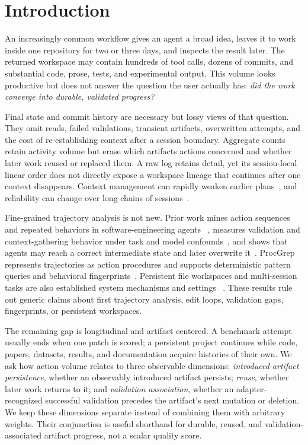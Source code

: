 \documentclass[letterpaper]{article}
\begin{document}
\section{Introduction}

An increasingly common workflow gives an agent a broad idea, leaves it to work
inside one repository for two or three days, and inspects the result later.
The returned workspace may contain hundreds of tool calls, dozens of commits,
and substantial code, prose, tests, and experimental output.  This volume
looks productive but does not answer the question the user actually has:
\emph{did the work converge into durable, validated progress?}

Final state and commit history are necessary but lossy views of that question.
They omit reads, failed validations, transient artifacts, overwritten attempts,
and the cost of re-establishing context after a session boundary.  Aggregate
counts retain activity volume but erase which artifacts actions concerned and
whether later work reused or replaced them.  A raw log retains detail, yet its
session-local linear order does not directly expose a workspace lineage that
continues after one context disappears.  Context management can rapidly weaken
earlier plans~\cite{mehta2026plans}, and reliability can change over long chains
of sessions~\cite{zhu2026aging}.

Fine-grained trajectory analysis is not new.  Prior work mines action
sequences and repeated behaviors in software-engineering agents
~\cite{bouzenia2025trajectories}, measures validation and context-gathering
behavior under task and model confounds~\cite{mehtiyev2026behavioral}, and
shows that agents may reach a correct intermediate state and later overwrite
it~\cite{kim2026trajeval}.  ProcGrep represents trajectories as action
procedures and supports deterministic pattern queries and behavioral
fingerprints~\cite{oderinwale2026procgrep}.  Persistent file workspaces and
multi-session tasks are also established system mechanisms and settings
~\cite{zhou2026orspace}.  These results rule out generic claims about first
trajectory analysis, edit loops, validation gaps, fingerprints, or persistent
workspaces.

The remaining gap is longitudinal and artifact centered.  A benchmark attempt
usually ends when one patch is scored; a persistent project continues while
code, papers, datasets, results, and documentation acquire histories of their
own.  We ask how action volume relates to three observable dimensions:
\emph{introduced-artifact persistence}, whether an observably introduced
artifact persists; \emph{reuse}, whether later work returns to it; and
\emph{validation association}, whether an adapter-recognized successful
validation precedes the artifact's next mutation or deletion.  We keep these dimensions
separate instead of combining them with arbitrary weights.  Their conjunction
is useful shorthand for durable, reused, and validation-associated artifact
progress, not a scalar quality score.
\end{document}
